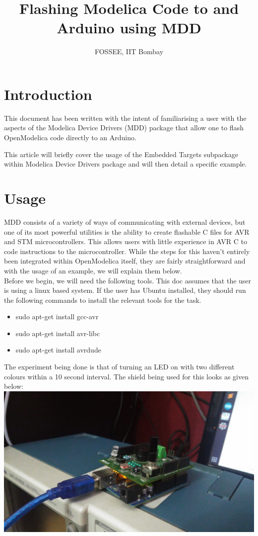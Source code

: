 \documentclass{hitec}
\author{FOSSEE, IIT Bombay}
\title{Flashing Modelica Code to and Arduino using MDD}
\begin{document}
\maketitle
\section{Introduction}
This document has been written with the intent of familiarising a user with the aspects of the Modelica Device Drivers (MDD) package that allow one to flash OpenModelica code directly to an Arduino.  

This article will briefly cover the usage of the Embedded Targets subpackage within Modelica Device Drivers package and will then detail a specific example.
\
\section{Usage}
MDD consists of a variety of ways of communicating with external devices, but one of its most powerful utilities is the ability to create flashable C files for AVR and STM microcontrollers. This allows users with little experience in AVR C to code instructions to the microcontroller. While the steps for this haven't entirely been integrated within OpenModelica itself, they are fairly straightforward and with the usage of an example, we will explain them below.
\\
Before we begin, we will need the following tools. This doc assumes that the user is using a linux based system. If the user has Ubuntu installed, they should run the following commands to install the relevant tools for the task.

\begin{itemize}
\item sudo apt-get install gcc-avr
\item sudo apt-get install avr-libc
\item sudo apt-get install avrdude
\end{itemize}

The experiment being done is that of turning an LED on with two different colours within a 10 second interval. The shield being used for this looks as given below:
\includegraphics[scale=0.1]{Image_Of_Shield.jpg}
\end{document}
